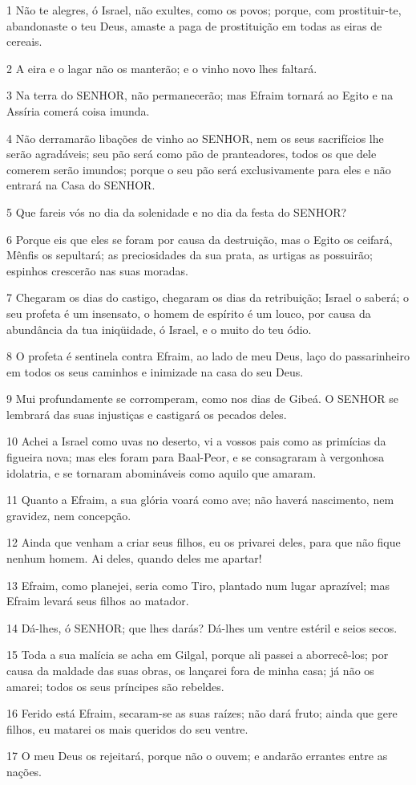 \par 1 Não te alegres, ó Israel, não exultes, como os povos; porque, com prostituir-te, abandonaste o teu Deus, amaste a paga de prostituição em todas as eiras de cereais.
\par 2 A eira e o lagar não os manterão; e o vinho novo lhes faltará.
\par 3 Na terra do SENHOR, não permanecerão; mas Efraim tornará ao Egito e na Assíria comerá coisa imunda.
\par 4 Não derramarão libações de vinho ao SENHOR, nem os seus sacrifícios lhe serão agradáveis; seu pão será como pão de pranteadores, todos os que dele comerem serão imundos; porque o seu pão será exclusivamente para eles e não entrará na Casa do SENHOR.
\par 5 Que fareis vós no dia da solenidade e no dia da festa do SENHOR?
\par 6 Porque eis que eles se foram por causa da destruição, mas o Egito os ceifará, Mênfis os sepultará; as preciosidades da sua prata, as urtigas as possuirão; espinhos crescerão nas suas moradas.
\par 7 Chegaram os dias do castigo, chegaram os dias da retribuição; Israel o saberá; o seu profeta é um insensato, o homem de espírito é um louco, por causa da abundância da tua iniqüidade, ó Israel, e o muito do teu ódio.
\par 8 O profeta é sentinela contra Efraim, ao lado de meu Deus, laço do passarinheiro em todos os seus caminhos e inimizade na casa do seu Deus.
\par 9 Mui profundamente se corromperam, como nos dias de Gibeá. O SENHOR se lembrará das suas injustiças e castigará os pecados deles.
\par 10 Achei a Israel como uvas no deserto, vi a vossos pais como as primícias da figueira nova; mas eles foram para Baal-Peor, e se consagraram à vergonhosa idolatria, e se tornaram abomináveis como aquilo que amaram.
\par 11 Quanto a Efraim, a sua glória voará como ave; não haverá nascimento, nem gravidez, nem concepção.
\par 12 Ainda que venham a criar seus filhos, eu os privarei deles, para que não fique nenhum homem. Ai deles, quando deles me apartar!
\par 13 Efraim, como planejei, seria como Tiro, plantado num lugar aprazível; mas Efraim levará seus filhos ao matador.
\par 14 Dá-lhes, ó SENHOR; que lhes darás? Dá-lhes um ventre estéril e seios secos.
\par 15 Toda a sua malícia se acha em Gilgal, porque ali passei a aborrecê-los; por causa da maldade das suas obras, os lançarei fora de minha casa; já não os amarei; todos os seus príncipes são rebeldes.
\par 16 Ferido está Efraim, secaram-se as suas raízes; não dará fruto; ainda que gere filhos, eu matarei os mais queridos do seu ventre.
\par 17 O meu Deus os rejeitará, porque não o ouvem; e andarão errantes entre as nações.

